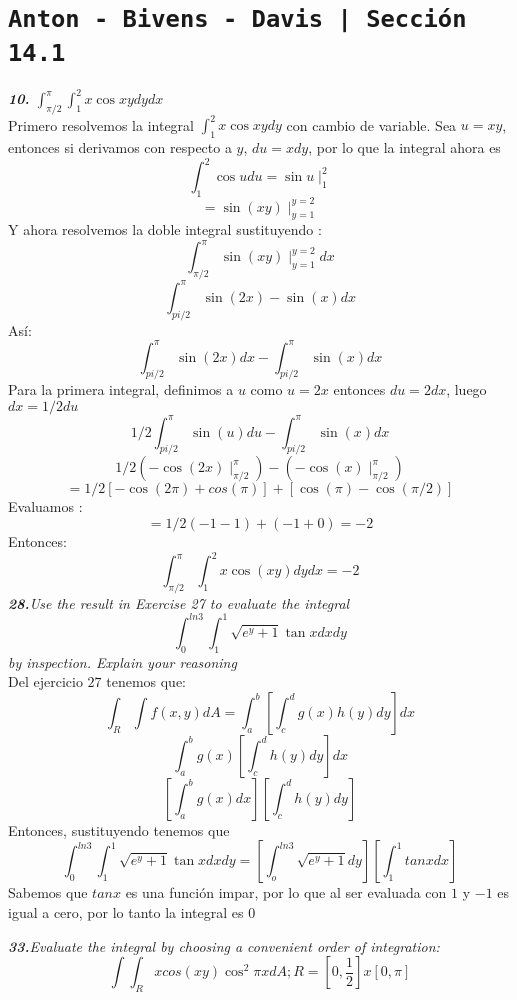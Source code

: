 \documentclass[a4paper,12pt]{article}
\begin{document}
\section{\texttt{Anton - Bivens - Davis | Sección 14.1}}
\textit{\textbf{10.} $\int^{\pi}_{\pi / 2}\int^2_1 x \cos xy dy dx$}\\

Primero resolvemos la integral $\int^2_1 x \cos xy dy$ con cambio de variable. Sea $u= xy$, entonces si derivamos con respecto a $y$,  $du = x dy$, por lo que la integral ahora es 
\[\int^2_1 \cos u du = \sin u\mid ^2 _1\]
\[= \sin(xy) \mid^{y=2}_{y=1}\]
Y ahora resolvemos la doble integral sustituyendo : 
\[\int^\pi_{\pi / 2} \sin(xy) \mid^{y=2}_{y=1} dx\]
\[\int^\pi_{pi / 2} \sin(2x)-\sin(x) dx\]
Así: 
\[\int^\pi_{pi / 2} \sin(2x) dx - \int^\pi_{pi / 2} \sin(x) dx\]
Para la primera integral, definimos a $u$ como $u = 2x$ entonces $du = 2 dx$, luego $dx = 1/2 du$
\[1/2 \int^\pi_{pi / 2}\sin(u) du - \int^\pi_{pi / 2} \sin(x) dx\]
\[1/2(-\cos(2x)\mid^\pi_{\pi / 2})-(-\cos(x)\mid^\pi_{\pi / 2}) \]
\[= 1/2[-\cos(2\pi)+cos(\pi)]+ [\cos(\pi)-\cos(\pi / 2)] \]
Evaluamos : 
\[= 1/2(-1-1)+(-1+0) = -2\]
Entonces: 
\[\int^{\pi}_{\pi / 2}\int^2_1 x \cos(xy) dy dx = -2\]
\textit{\textbf{28.}Use the result in Exercise 27 to evaluate the integral 
\[\int^{ln 3}_{0} \int_1 ^1 \sqrt{e^y + 1}\tan x dx dy\] by inspection. Explain your reasoning}\\

Del ejercicio $27$ tenemos que:
\[\int_{R}\int f(x,y)dA = \int_a^b[\int_c^dg(x)h(y)dy]dx\]
\[\int_a^b g(x)[\int_c^dh(y)dy ]dx\]
\[[\int_a^b g(x) dx][\int_c^d h(y) dy]\]
Entonces, sustituyendo tenemos que 
\[\int^{ln 3}_{0} \int_1 ^1 \sqrt{e^y + 1}\tan x dx dy=[\int_o^{ln3} \sqrt{e^y + 1}dy][\int_1^1tan x dx]\]
Sabemos que $tan x$ es una función impar, por lo que al ser evaluada con $1$ y $-1$ es igual a cero, por lo tanto la integral es $0$\

\textit{\textbf{33.}Evaluate the integral by choosing a convenient order of integration:}
\[\int \int_{R}xcos(xy)\cos^2 \pi x dA; R = [0, \dfrac{1}{2}] x [0, \pi] \]
\end{document}
